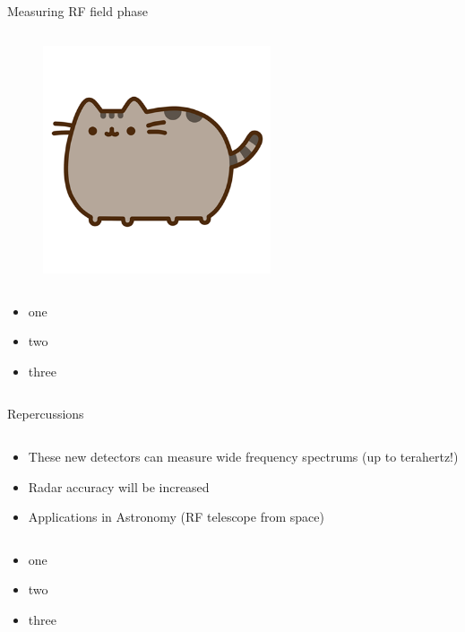 \begin{columnframe}{Measuring RF field phase}
    \begin{column}{0.5\textwidth}
        \begin{figure}
            \centering
            \includegraphics[width=0.6\textwidth]{images/pusheen.png}
        \end{figure}
    \end{column}
    \begin{column}{0.5\textwidth}
        \begin{itemize}
            \item one
            \item two
            \item three
        \end{itemize}
    \end{column}
\end{columnframe}

\begin{columnframe}{Repercussions}
    \begin{column}{0.48\textwidth}
        \begin{itemize}
            \item These new detectors can measure wide frequency spectrums (up to terahertz!)
            \item Radar accuracy will be increased
            \item Applications in Astronomy (RF telescope from space)
        \end{itemize}
    \end{column}
    \begin{column}{0.48\textwidth}
        \begin{itemize}
            \item one
            \item two
            \item three
        \end{itemize}
    \end{column}
\end{columnframe}

